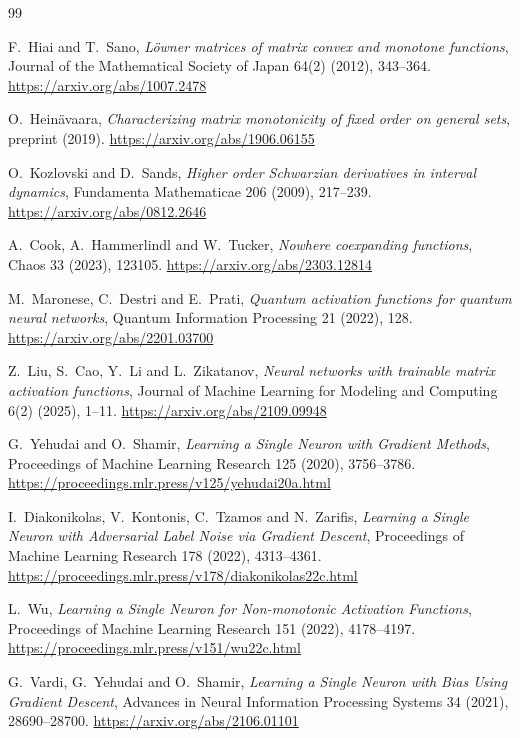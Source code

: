\documentclass[11pt]{article}
\begin{document}
\begin{thebibliography}{99}
\let\oldbibitem\bibitem
\renewcommand{\bibitem}{\par\oldbibitem}
\setlength{\itemsep}{1pt}
\small
{}
F.~Hiai and T.~Sano,
\emph{L\"owner matrices of matrix convex and monotone functions},
Journal of the Mathematical Society of Japan 64(2) (2012), 343--364.
\url{https://arxiv.org/abs/1007.2478}

O.~Hein\"avaara,
\emph{Characterizing matrix monotonicity of fixed order on general sets},
preprint (2019).
\url{https://arxiv.org/abs/1906.06155}

O.~Kozlovski and D.~Sands,
\emph{Higher order Schwarzian derivatives in interval dynamics},
Fundamenta Mathematicae 206 (2009), 217--239.
\url{https://arxiv.org/abs/0812.2646}

A.~Cook, A.~Hammerlindl and W.~Tucker,
\emph{Nowhere coexpanding functions},
Chaos 33 (2023), 123105.
\url{https://arxiv.org/abs/2303.12814}

M.~Maronese, C.~Destri and E.~Prati,
\emph{Quantum activation functions for quantum neural networks},
Quantum Information Processing 21 (2022), 128.
\url{https://arxiv.org/abs/2201.03700}

Z.~Liu, S.~Cao, Y.~Li and L.~Zikatanov,
\emph{Neural networks with trainable matrix activation functions},
Journal of Machine Learning for Modeling and Computing 6(2) (2025), 1--11.
\url{https://arxiv.org/abs/2109.09948}

G.~Yehudai and O.~Shamir,
\emph{Learning a Single Neuron with Gradient Methods},
Proceedings of Machine Learning Research 125 (2020), 3756--3786.
\url{https://proceedings.mlr.press/v125/yehudai20a.html}

I.~Diakonikolas, V.~Kontonis, C.~Tzamos and N.~Zarifis,
\emph{Learning a Single Neuron with Adversarial Label Noise via Gradient Descent},
Proceedings of Machine Learning Research 178 (2022), 4313--4361.
\url{https://proceedings.mlr.press/v178/diakonikolas22c.html}

L.~Wu,
\emph{Learning a Single Neuron for Non-monotonic Activation Functions},
Proceedings of Machine Learning Research 151 (2022), 4178--4197.
\url{https://proceedings.mlr.press/v151/wu22c.html}

G.~Vardi, G.~Yehudai and O.~Shamir,
\emph{Learning a Single Neuron with Bias Using Gradient Descent},
Advances in Neural Information Processing Systems 34 (2021), 28690--28700.
\url{https://arxiv.org/abs/2106.01101}


\end{thebibliography}
\end{document}
